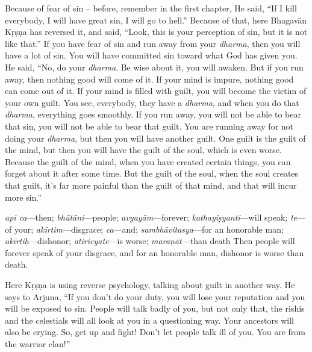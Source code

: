 Because of fear of sin – before, remember in the first chapter, He said, “If I kill everybody, I will have great sin, I will go to hell.” Because of that, here Bhagavān Kṛṣṇa has reversed it, and said, “Look, this is your perception of sin, but it is not like that.” If you have fear of sin and run away from your \textit{dharma}, then you will have a lot of sin. You will have committed sin toward what God has given you. He said, “No, do your \textit{dharma}. Be wise about it, you will awaken. But if you run away, then nothing good will come of it. If your mind is impure, nothing good can come out of it. If your mind is filled with guilt, you will become the victim of your own guilt. You see, everybody, they have a \textit{dharma}, and when you do that \textit{dharma}, everything goes smoothly. If you run away, you will not be able to bear that sin, you will not be able to bear that guilt. You are running away for not doing your \textit{dharma}, but then you will have another guilt. One guilt is the guilt of the mind, but then you will have the guilt of the soul, which is even worse. Because the guilt of the mind, when you have created certain things, you can forget about it after some time. But the guilt of the soul, when the soul creates that guilt, it’s far more painful than the guilt of that mind, and that will incur more sin.”

{%
  \textit{api ca}---then; 
  \textit{bhūtāni}---people; 
  \textit{avyayām}---forever; 
  \textit{kathayiṣyanti}---will speak; 
  \textit{te}---of your; 
  \textit{akīrtim}---disgrace; 
  \textit{ca}---and; 
  \textit{sambhāvitasya}---for an honorable man; 
  \textit{akīrtiḥ}---dishonor; 
  \textit{atiricyate}---is worse; 
  \textit{maraṇāt}---than death
}
{%
  Then people will forever speak of your disgrace, and for an honorable man, dishonor is worse than death.
}

Here Kṛṣṇa is using reverse psychology, talking about guilt in another way. He says to Arjuna, “If you don’t do your duty, you will lose your reputation and you will be exposed to sin. People will talk badly of you, but not only that, the rishis and the celestials will all look at you in a questioning way. Your ancestors will also be crying. So, get up and fight! Don’t let people talk ill of you. You are from the warrior clan!”

